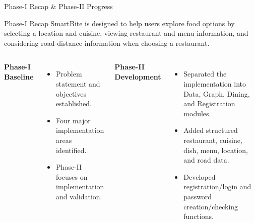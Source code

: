 \documentclass[aspectratio=169,10pt]{beamer}
\begin{document}
\begin{frame}{Phase-I Recap \& Phase-II Progress}
\begin{block}{Phase-I Recap}
SmartBite is designed to help users explore food options by selecting a location and cuisine, viewing restaurant and menu information, and considering road-distance information when choosing a restaurant.
\end{block}
\begin{columns}[T,totalwidth=\textwidth]
\textbf{\color{GEUBlue}Phase-I Baseline}
\begin{itemize}\itemsep3pt
\item Problem statement and objectives established.
\item Four major implementation areas identified.
\item Phase-II focuses on implementation and validation.
\end{itemize}
\textbf{\color{GEUBlue}Phase-II Development}
\begin{itemize}\itemsep3pt
\item Separated the implementation into Data, Graph, Dining, and Registration modules.
\item Added structured restaurant, cuisine, dish, menu, location, and road data.
\item Developed registration/login and password creation/checking functions.
\end{itemize}
\end{columns}

\end{frame}
\end{document}
